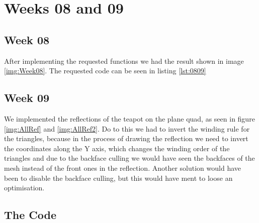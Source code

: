 \chapter{Weeks 08 and 09}

  \section{Week 08}

    After implementing the requested functions we had the result shown in
    image \ref{img:Week08}. The requested code can be seen in listing
    \ref{lst:0809}

  \section{Week 09}

    We implemented the reflections of the teapot on the plane quad, as seen in figure \ref{img:AllRef} and
    \ref{img:AllRef2}.
    Do to this we had to invert the winding rule for the triangles, because in the process
    of drawing the reflection we need to invert the coordinates along the Y axis, which
    changes the winding order of the triangles and due to the backface culling we would have
    seen the backfaces of the mesh instead of the front ones in the reflection. Another solution
    would have been to disable the backface culling, but this would have ment to loose an
    optimisation.



  \section{The Code}

